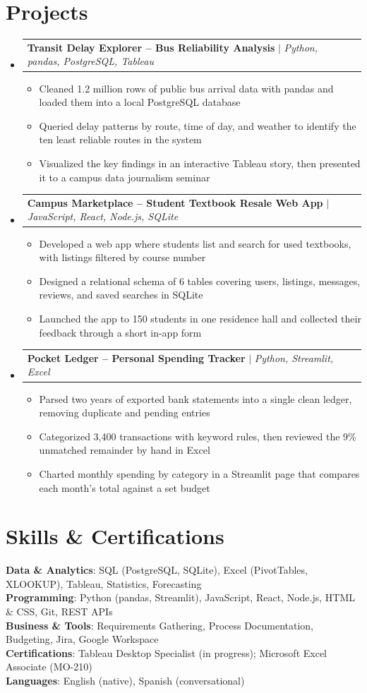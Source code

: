 \documentclass[letterpaper,11pt]{article}
\makeatletter
\newcommand{\resumeItem}[1]{\item\small{#1}}
\newcommand{\resumeProjectHeading}[2]{
    \item
    \begin{tabular*}{0.97\textwidth}{l@{\extracolsep{\fill}}r}
      \small#1 & #2 \\
    \end{tabular*}\vspace{2pt}
}
\newcommand{\resumeSubHeadingListStart}{\begin{itemize}[leftmargin=0.15in, label={}, itemsep=2pt, topsep=0pt, parsep=0pt, partopsep=0pt]}
\newcommand{\resumeSubHeadingListEnd}{\end{itemize}}
\newcommand{\resumeItemListStart}{\begin{itemize}[itemsep=0pt, topsep=0pt, parsep=0pt, partopsep=0pt]}
\newcommand{\resumeItemListEnd}{\end{itemize}}
\makeatother
\begin{document}
\section{Projects}
    \resumeSubHeadingListStart
      \resumeProjectHeading
          {\textbf{Transit Delay Explorer -- Bus Reliability Analysis} $|$ \emph{Python, pandas, PostgreSQL, Tableau}}{}
          \resumeItemListStart
            \resumeItem{Cleaned 1.2 million rows of public bus arrival data with pandas and loaded them into a local PostgreSQL database}
            \resumeItem{Queried delay patterns by route, time of day, and weather to identify the ten least reliable routes in the system}
            \resumeItem{Visualized the key findings in an interactive Tableau story, then presented it to a campus data journalism seminar}
          \resumeItemListEnd
      \resumeProjectHeading
          {\textbf{Campus Marketplace -- Student Textbook Resale Web App} $|$ \emph{JavaScript, React, Node.js, SQLite}}{}
          \resumeItemListStart
            \resumeItem{Developed a web app where students list and search for used textbooks, with listings filtered by course number}
            \resumeItem{Designed a relational schema of 6 tables covering users, listings, messages, reviews, and saved searches in SQLite}
            \resumeItem{Launched the app to 150 students in one residence hall and collected their feedback through a short in-app form}
          \resumeItemListEnd
      \resumeProjectHeading
          {\textbf{Pocket Ledger -- Personal Spending Tracker} $|$ \emph{Python, Streamlit, Excel}}{}
          \resumeItemListStart
            \resumeItem{Parsed two years of exported bank statements into a single clean ledger, removing duplicate and pending entries}
            \resumeItem{Categorized 3,400 transactions with keyword rules, then reviewed the 9\% unmatched remainder by hand in Excel}
            \resumeItem{Charted monthly spending by category in a Streamlit page that compares each month's total against a set budget}
          \resumeItemListEnd
    \resumeSubHeadingListEnd

\section{Skills \& Certifications}
 \begin{itemize}[leftmargin=0.15in, label={}]
    \small{\item{
     \textbf{Data \& Analytics}{: SQL (PostgreSQL, SQLite), Excel (PivotTables, XLOOKUP), Tableau, Statistics, Forecasting} \\
     \textbf{Programming}{: Python (pandas, Streamlit), JavaScript, React, Node.js, HTML \& CSS, Git, REST APIs} \\
     \textbf{Business \& Tools}{: Requirements Gathering, Process Documentation, Budgeting, Jira, Google Workspace} \\
     \textbf{Certifications}{: Tableau Desktop Specialist (in progress); Microsoft Excel Associate (MO-210)} \\
     \textbf{Languages}{: English (native), Spanish (conversational)}
    }}
 \end{itemize}

\end{document}

